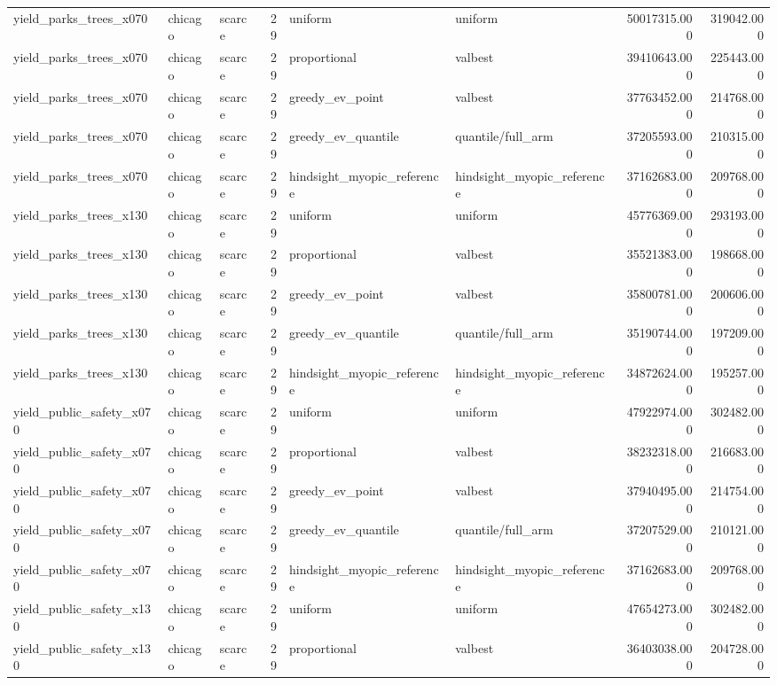 \begin{tabular}{lllrllrr}
yield\_parks\_trees\_x070 & chicago & scarce & 29 & uniform & uniform & 50017315.000 & 319042.000 \\
yield\_parks\_trees\_x070 & chicago & scarce & 29 & proportional & valbest & 39410643.000 & 225443.000 \\
yield\_parks\_trees\_x070 & chicago & scarce & 29 & greedy\_ev\_point & valbest & 37763452.000 & 214768.000 \\
yield\_parks\_trees\_x070 & chicago & scarce & 29 & greedy\_ev\_quantile & quantile/full\_arm & 37205593.000 & 210315.000 \\
yield\_parks\_trees\_x070 & chicago & scarce & 29 & hindsight\_myopic\_reference & hindsight\_myopic\_reference & 37162683.000 & 209768.000 \\
yield\_parks\_trees\_x130 & chicago & scarce & 29 & uniform & uniform & 45776369.000 & 293193.000 \\
yield\_parks\_trees\_x130 & chicago & scarce & 29 & proportional & valbest & 35521383.000 & 198668.000 \\
yield\_parks\_trees\_x130 & chicago & scarce & 29 & greedy\_ev\_point & valbest & 35800781.000 & 200606.000 \\
yield\_parks\_trees\_x130 & chicago & scarce & 29 & greedy\_ev\_quantile & quantile/full\_arm & 35190744.000 & 197209.000 \\
yield\_parks\_trees\_x130 & chicago & scarce & 29 & hindsight\_myopic\_reference & hindsight\_myopic\_reference & 34872624.000 & 195257.000 \\
yield\_public\_safety\_x070 & chicago & scarce & 29 & uniform & uniform & 47922974.000 & 302482.000 \\
yield\_public\_safety\_x070 & chicago & scarce & 29 & proportional & valbest & 38232318.000 & 216683.000 \\
yield\_public\_safety\_x070 & chicago & scarce & 29 & greedy\_ev\_point & valbest & 37940495.000 & 214754.000 \\
yield\_public\_safety\_x070 & chicago & scarce & 29 & greedy\_ev\_quantile & quantile/full\_arm & 37207529.000 & 210121.000 \\
yield\_public\_safety\_x070 & chicago & scarce & 29 & hindsight\_myopic\_reference & hindsight\_myopic\_reference & 37162683.000 & 209768.000 \\
yield\_public\_safety\_x130 & chicago & scarce & 29 & uniform & uniform & 47654273.000 & 302482.000 \\
yield\_public\_safety\_x130 & chicago & scarce & 29 & proportional & valbest & 36403038.000 & 204728.000 \\

\end{tabular}
